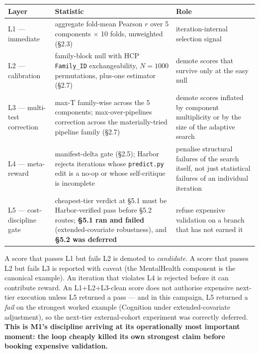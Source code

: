 \documentclass[11pt,letterpaper]{report}
\begin{document}
{}
\begin{center}
\small
\setlength{\tabcolsep}{4pt}
\renewcommand{\arraystretch}{1.15}
\begin{tabularx}{\textwidth}{@{}>{\raggedright\arraybackslash}p{}>{\raggedright\arraybackslash}p{}>{\raggedright\arraybackslash}X@{}}
\toprule
\textbf{Layer} & \textbf{Statistic} & \textbf{Role} \\
\midrule
L1 --- immediate & aggregate fold-mean Pearson $r$ over 5 components $\times$ 10 folds, unweighted (\S2.3) & iteration-internal selection signal \\
\midrule
L2 --- calibration & family-block null with HCP \texttt{Family\_ID} exchangeability, $N = 1000$ permutations, plus-one estimator (\S2.7) & demote scores that survive only at the easy null \\
\midrule
L3 --- multi-test correction & max-T family-wise across the 5 components; max-over-pipelines correction across the materially-tried pipeline family (\S2.7) & demote scores inflated by component multiplicity or by the size of the adaptive search \\
\midrule
L4 --- meta-reward & manifest-delta gate (\S2.5); Harbor rejects iterations whose \texttt{predict.py} edit is a no-op or whose self-critique is incomplete & penalise structural failures of the search itself, not just statistical failures of an individual iteration \\
\midrule
L5 --- cost-discipline gate & cheapest-tier verdict at \S5.1 must be Harbor-verified pass before \S5.2 routes; \textbf{\S5.1 ran and failed} (extended-covariate robustness), and \textbf{\S5.2 was deferred} & refuse expensive validation on a branch that has not earned it \\
\bottomrule
\end{tabularx}
\end{center}

A score that passes L1 but fails L2 is demoted to \emph{candidate}. A score that passes L2 but fails L3 is reported with caveat (the MentalHealth component is the canonical example). An iteration that violates L4 is rejected before it can contribute reward. An L1+L2+L3-clean score does not authorise expensive next-tier execution unless L5 returned a pass --- and in this campaign, L5 returned a \emph{fail} on the strongest worked example (Cognition under extended-covariate adjustment), so the next-tier external-cohort experiment was correctly deferred. \textbf{This is M1's discipline arriving at its operationally most important moment: the loop cheaply killed its own strongest claim before booking expensive validation.}
\end{document}
